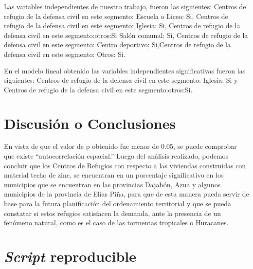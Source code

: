 \documentclass[11pt,]{article}
\begin{document}
Las variables independientes de nuestro trabajo, fueron las siguientes:
Centros de refugio de la defensa civil en este segmento: Escuela o
Liceo: Si, Centros de refugio de la defensa civil en este segmento:
Iglesia: Si, Centros de refugio de la defensa civil en este
segmento:otros:Si Salón comunal: Si, Centros de refugio de la defensa
civil en este segmento: Centro deportivo: Si,Centros de refugio de la
defensa civil en este segmento: Otros: Si.

En el modelo lineal obtenido las variables independientes significativas
fueron las siguientes: Centros de refugio de la defensa civil en este
segmento: Iglesia: Si y Centros de refugio de la defensa civil en este
segmento:otros:Si.

\section{Discusión o Conclusiones}\label{discusiuxf3n-o-conclusiones}

En vista de que el valor de p obtenido fue menor de 0.05, se puede
comprobar que existe ``autocorrelación espacial.'' Luego del análisis
realizado, podemos concluir que los Centros de Refugios con respecto a
las viviendas construidas con material techo de zinc, se encuentran en
un porcentaje significativo en los municipios que se encuentran en las
provincias Dajabón, Azua y algunos municipios de la provincia de Elías
Piña, para que de esta manera pueda servir de base para la futura
planificación del ordenamiento territorial y que se pueda constatar si
estos refugios satisfacen la demanda, ante la presencia de un fenómeno
natural, como es el caso de las tormentas tropicales o Huracanes.

\section{\texorpdfstring{\emph{Script}
reproducible}{Script reproducible}}\label{script-reproducible}
\end{document}
